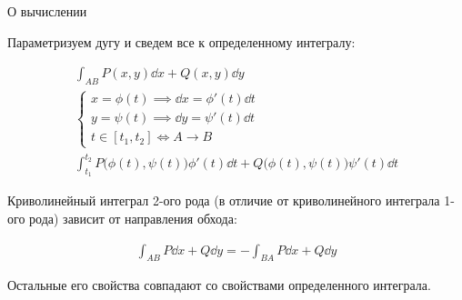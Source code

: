 \begin{remark}\label{curve-int-2-calc}
  О вычислении

  Параметризуем дугу и сведем все к определенному интегралу:

  \begin{align*}
    \int_{AB} P(x, y) \dd x + Q(x, y) \dd y \\
    \begin{cases}
      x = \phi(t) \implies \dd x = \phi'(t) \dd t \\
      y = \psi(t) \implies \dd y = \psi'(t) \dd t \\
      t \in [t_{1}, t_{2}] \iff A \to B
    \end{cases}
    \\
    \int_{t_{1}}^{t_{2}}
      P \Big( \phi(t), \psi(t) \Big) \phi'(t) \dd t
      + Q \Big( \phi(t), \psi(t) \Big) \psi'(t) \dd t
  \end{align*}
\end{remark}

\begin{remark}
  Криволинейный интеграл 2-ого рода (в отличие от криволинейного интеграла
  1-ого рода) зависит от направления обхода:

  \begin{align*}
    \int_{AB} P \dd x + Q \dd y = -\int_{BA} P \dd x + Q \dd y
  \end{align*}

  Остальные его свойства совпадают со свойствами определенного интеграла.
\end{remark}

